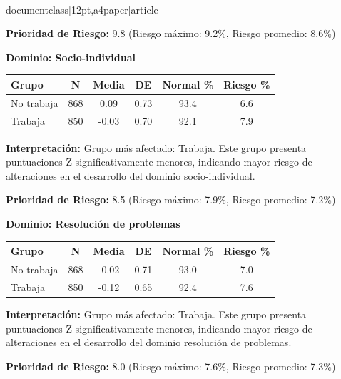 \\documentclass[12pt,a4paper]{article}
\begin{document}
\textbf{Prioridad de Riesgo:} 9.8 (Riesgo máximo: 9.2\%, Riesgo promedio: 8.6\%)


\vspace{0.5cm}


\textbf{Dominio: Socio-individual}


\begin{center}
\begin{tabular}{|l|c|c|c|c|c|}
\hline
\textbf{Grupo} & \textbf{N} & \textbf{Media} & \textbf{DE} & \textbf{Normal \%} & \textbf{Riesgo \%} \\
\hline
No trabaja & 868 & 0.09 & 0.73 & 93.4 & 6.6 \\
Trabaja & 850 & -0.03 & 0.70 & 92.1 & 7.9 \\

\hline
\end{tabular}
\end{center}


\textbf{Interpretación:} Grupo más afectado: Trabaja. Este grupo presenta puntuaciones Z significativamente menores, indicando mayor riesgo de alteraciones en el desarrollo del dominio socio-individual.

\textbf{Prioridad de Riesgo:} 8.5 (Riesgo máximo: 7.9\%, Riesgo promedio: 7.2\%)


\vspace{0.5cm}


\textbf{Dominio: Resolución de problemas}


\begin{center}
\begin{tabular}{|l|c|c|c|c|c|}
\hline
\textbf{Grupo} & \textbf{N} & \textbf{Media} & \textbf{DE} & \textbf{Normal \%} & \textbf{Riesgo \%} \\
\hline
No trabaja & 868 & -0.02 & 0.71 & 93.0 & 7.0 \\
Trabaja & 850 & -0.12 & 0.65 & 92.4 & 7.6 \\

\hline
\end{tabular}
\end{center}


\textbf{Interpretación:} Grupo más afectado: Trabaja. Este grupo presenta puntuaciones Z significativamente menores, indicando mayor riesgo de alteraciones en el desarrollo del dominio resolución de problemas.

\textbf{Prioridad de Riesgo:} 8.0 (Riesgo máximo: 7.6\%, Riesgo promedio: 7.3\%)


\vspace{0.5cm}
\end{document}
